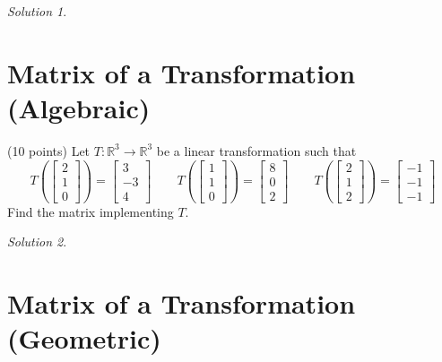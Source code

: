 \documentclass{article}
\theoremstyle{remark}
\newtheorem*{solution}{Solution}
\begin{document}
\begin{solution}
\end{solution}

\pagebreak
\section{Matrix of a Transformation (Algebraic)}

(10 points) Let $T : \mathbb R^3 \to \mathbb R^3$ be a linear transformation such that
\begin{displaymath}
  T\left(
  \begin{bmatrix}
    2 \\ 1 \\ 0
  \end{bmatrix}
  \right)
  =
  \begin{bmatrix}
    3 \\ -3 \\ 4
  \end{bmatrix}
  \qquad
  T\left(
  \begin{bmatrix}
    1 \\ 1 \\ 0
  \end{bmatrix}
  \right)
  =
  \begin{bmatrix}
    8 \\ 0 \\ 2
  \end{bmatrix}
  \qquad
  T\left(
  \begin{bmatrix}
    2 \\ 1 \\ 2
  \end{bmatrix}
  \right)
  =
  \begin{bmatrix}
    -1 \\ -1 \\ -1
  \end{bmatrix}
\end{displaymath}
Find the matrix implementing $T$.
\medskip

\begin{solution}
\end{solution}

\pagebreak
\section{Matrix of a Transformation (Geometric)}
\end{document}
